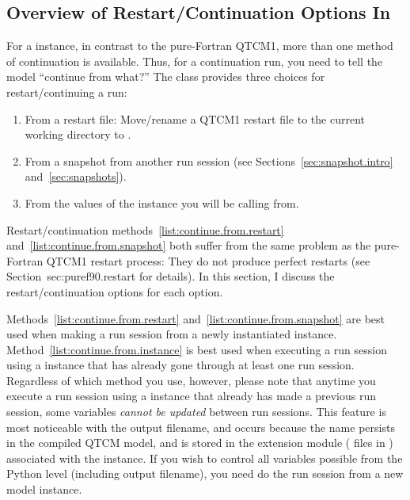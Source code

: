 	\subsection{Overview of Restart/Continuation Options In }
					\label{sec:restart.options.list}

For a  instance, in contrast to the pure-Fortran QTCM1,
more than one method of continuation is available.
Thus, for a continuation run, you need to tell the model
``continue from what?''
The  class provides three choices for restart/continuing
a run:
\begin{enumerate} 
\item From a restart file:  Move/rename a QTCM1 restart file
        to the current working directory to .
	\label{list:continue.from.restart}

\item From a snapshot from another run session
	(see Sections~\ref{sec:snapshot.intro} and~\ref{sec:snapshots}).
	\label{list:continue.from.snapshot}

\item From the values of the  instance you will be
	calling  from.
	\label{list:continue.from.instance}
\end{enumerate}

Restart/continuation methods~\ref{list:continue.from.restart} 
and~\ref{list:continue.from.snapshot} both suffer from the
same problem as the pure-Fortran QTCM1 restart process:
They do not produce perfect restarts
(see Section~{sec:puref90.restart} for details).
In this section, I discuss the restart/continuation options
for each  option.

Methods~\ref{list:continue.from.restart}
and~\ref{list:continue.from.snapshot} are best used when making a
run session from a newly instantiated  instance.
Method~\ref{list:continue.from.instance} is best used when executing
a run session using a  instance that has already gone
through at least one run session.  Regardless of which method you
use, however, please note that anytime you execute a run session
using a  instance that already has made a previous run
session, some variables \emph{cannot be updated} between run sessions.
This feature is most noticeable with the output filename, and occurs
because the name persists in the compiled QTCM model, and is stored
in the extension module ( files in ) associated
with the instance.  If you wish to control all variables possible
from the Python level (including output filename), you need do the
run session from a new model instance.


